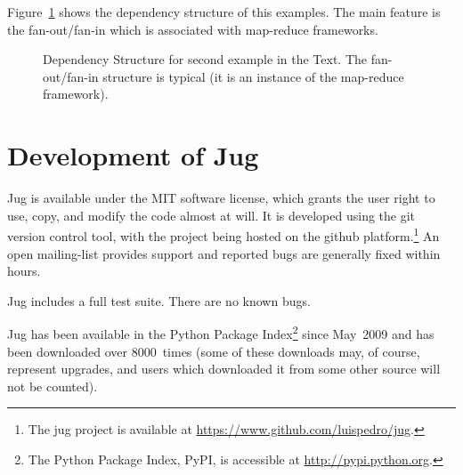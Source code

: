 \documentclass{article}
\begin{document}
Figure~\ref{fig:jug-deps-complex} shows the dependency structure of this
examples. The main feature is the fan-out/fan-in which is associated with
map-reduce frameworks.

\begin{figure}
\begin{center}

\end{center}
\caption{Dependency Structure for second example in the Text. The
fan-out/fan-in structure is typical (it is an instance of the map-reduce
framework).}
\label{fig:jug-deps-complex}
\end{figure}

\section{Development of Jug}
Jug is available under the MIT software license, which grants the user right to
use, copy, and modify the code almost at will. It is developed using the git
version control tool, with the project being hosted on the github
platform.\footnote{The jug project is available at
\url{https://www.github.com/luispedro/jug}.} An open mailing-list provides
support and reported bugs are generally fixed within hours.

Jug includes a full test suite. There are no known bugs.

Jug has been available in the Python Package Index\footnote{The Python Package
Index, PyPI, is accessible at \url{http://pypi.python.org}.} since May~2009
and has been downloaded over 8000~times (some of these downloads may, of
course, represent upgrades, and users which downloaded it from some other
source will not be counted).%
\end{document}
